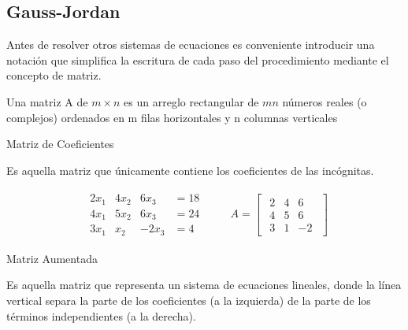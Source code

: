\documentclass{article}
\begin{document}
\subsection{Gauss-Jordan}

Antes de resolver otros sistemas de ecuaciones es conveniente introducir una notación que simplifica la escritura de cada paso del procedimiento mediante el concepto de matriz.

\begin{tcolorbox}[colback=blue!10!white,colframe=blue!60!black,title=Definición]
    Una matriz A de $m \times n$ es un arreglo rectangular de $mn$ números reales (o complejos) ordenados en m filas horizontales y n columnas verticales
\end{tcolorbox}

\begin{large}
    Matriz de Coeficientes
\end{large}

Es aquella matriz que únicamente contiene los coeficientes de las incógnitas.

\begin{equation*}
    \begin{matrix}
        \begin{array}{rrrr}
            2x_1 & 4x_2 & 6x_3 &=18\\
            4x_1 & 5x_2 & 6x_3 &=24\\
            3x_1 & x_2  & -2x_3 &=4            
        \end{array}
    \end{matrix}
    \quad \quad A = \begin{bmatrix}
        \begin{array}{rrr}
            2 & 4 & 6 \\
            4 & 5 & 6 \\
            3 & 1 & -2         
        \end{array}    
    \end{bmatrix}
\end{equation*}

\begin{large}
    Matriz Aumentada
\end{large}

Es aquella matriz que representa un sistema de ecuaciones lineales, donde la línea vertical separa la parte de los coeficientes (a la izquierda) de la parte de los términos independientes (a la derecha).
\end{document}
